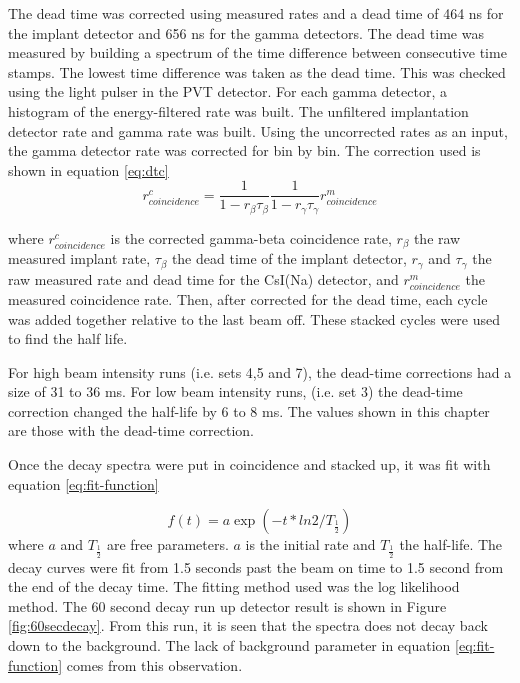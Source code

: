 The dead time was corrected using measured rates and a dead time of 464 ns for the implant detector and 656 ns for the gamma detectors.  
The dead time was measured by building a spectrum of the time difference between consecutive time stamps.
The lowest time difference was taken as the dead  time. 
This was checked using the light pulser in the PVT detector.
For each gamma detector, a histogram of the energy-filtered rate was built.
The unfiltered implantation detector rate and gamma rate was built.
Using the uncorrected rates as an input, the gamma detector rate was corrected for bin by bin.
The correction used is shown in equation \ref{eq:dtc}
%
\begin{equation}
r^{c}_{coincidence} = \frac{1}{1 - r_{\beta}\tau_{\beta}}\frac{1}{1 - r_{\gamma}\tau_{\gamma}}r^{m}_{coincidence} 
	\label{eq:dtc} 
\end{equation}
%

where $r^{c}_{coincidence}$ is the corrected gamma-beta coincidence rate, $r_{\beta}$ the raw measured implant rate, $\tau_{\beta}$ the dead time of the implant detector, $r_{\gamma}$ and $\tau_{\gamma}$ the raw measured rate and dead time for the CsI(Na) detector, and $r^{m}_{coincidence}$ the measured coincidence rate.   
Then, after corrected for the dead time, each cycle was added together relative to the last beam off.
These stacked cycles were used to find the half life.

For high beam intensity runs (i.e. sets 4,5 and 7), the dead-time corrections had a size of 31 to 36 ms.
For low beam intensity runs, (i.e. set 3) the dead-time correction changed the half-life by 6 to 8 ms. 
The values shown in this chapter are those with the dead-time correction.

Once the decay spectra were put in coincidence and stacked up, it was fit with equation \ref{eq:fit-function}

%
\begin{equation}
	f(t) = a\exp{(-t*ln2/T_{\frac{1}{2}})}
	\label{eq:fit-function}
\end{equation}
%
where $a$ and $T_{\frac{1}{2}}$ are free parameters.
$a$ is the initial rate and $T_{\frac{1}{2}}$ the half-life.
The decay curves were fit from 1.5 seconds past the beam on time to 1.5 second from the end of the decay time. 
The fitting method used was the log likelihood method. 
The 60 second decay run up detector result is shown in Figure \ref{fig:60secdecay}.
From this run, it is seen that the spectra does not decay back down to the background. 
The lack of background parameter in equation \ref{eq:fit-function} comes from this observation. 

